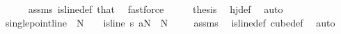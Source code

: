 \begin{isabellebody}
\ \ \ \ \isamarkupfalse%
\ assms\ is{\isacharunderscore}{\kern0pt}line{\isacharunderscore}{\kern0pt}def\ that{\isacharparenleft}{\kern0pt}{}{\isacharparenright}{\kern0pt}\ \isamarkupfalse%
\ fastforce\isanewline
\ \ \isamarkupfalse%
\ \isamarkupfalse%
\ {\isacharquery}{\kern0pt}thesis\ \isamarkupfalse%
\ hj{\isacharunderscore}{\kern0pt}def\ \isamarkupfalse%
\ auto\isanewline
{}\isamarkupfalse%
%
\endisatagproof
{\isafoldproof}%
%
\isadelimproof
\isanewline
%
\endisadelimproof
\isanewline
{}\isamarkupfalse%
\ single{\isacharunderscore}{\kern0pt}point{\isacharunderscore}{\kern0pt}line{\isacharcolon}{\kern0pt}\ \ {\isachardoublequoteopen}N\ {\isachargreater}{\kern0pt}\ {}{\isachardoublequoteclose}\ \ {\isachardoublequoteopen}is{\isacharunderscore}{\kern0pt}line\ {\isacharparenleft}{\kern0pt}{\isasymlambda}s{\isasymin}{\isacharbraceleft}{\kern0pt}{\isachardot}{\kern0pt}{\isachardot}{\kern0pt}{\isacharless}{\kern0pt}{}{\isacharbraceright}{\kern0pt}{\isachardot}{\kern0pt}\ {\isasymlambda}a{\isasymin}{\isacharbraceleft}{\kern0pt}{\isachardot}{\kern0pt}{\isachardot}{\kern0pt}{\isacharless}{\kern0pt}N{\isacharbraceright}{\kern0pt}{\isachardot}{\kern0pt}\ {}{\isacharparenright}{\kern0pt}\ N\ {}{\isachardoublequoteclose}\isanewline
%
\isadelimproof
\ \ %
\endisadelimproof
%
\isatagproof
{}\isamarkupfalse%
\ assms\ \isamarkupfalse%
\ is{\isacharunderscore}{\kern0pt}line{\isacharunderscore}{\kern0pt}def\ cube{\isacharunderscore}{\kern0pt}def\ \isamarkupfalse%
\ auto%
\endisatagproof
{\isafoldproof}%
%
\isadelimproof
\isanewline
%
\endisadelimproof
\isanewline
{}\isamarkupfalse%

\end{isabellebody}
